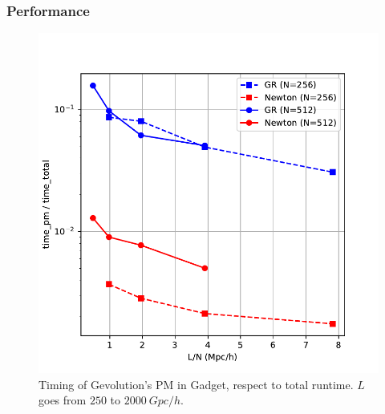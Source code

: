 \documentclass{beamer}
\makeatletter
\newcommand{\mylabel}{%
}
\makeatother
\begin{document}
\begin{frame}[label=performancetime]
   \frametitle{Performance\mylabel}
  \vspace*{-.5cm}
  \begin{figure}
      \includegraphics[height=.8\textheight]{images/appendix/gr-vs-newton.pdf}%
      \caption{Timing of Gevolution's PM in Gadget, respect to total runtime.
      $L$ goes from $250$ to $\SI{2000}{Gpc}/h$.}
  \end{figure}
\end{frame}
\end{document}
